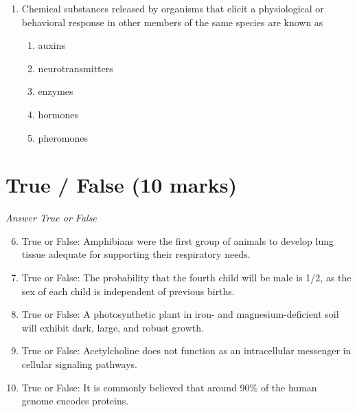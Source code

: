 \documentclass[12pt]{article}
\begin{document}
\begin{enumerate}[label=\arabic*.]
\begin{enumerate}[label=(\alph*)]
    \item RNAse H
    \item Helicase
    \item integrase
    \item DNA ligase
    \item protease
\end{enumerate}
\item Chemical substances released by organisms that elicit a physiological or behavioral response in other members of the same species are known as
\begin{enumerate}[label=(\alph*)]
    \item auxins
    \item neurotransmitters
    \item enzymes
    \item hormones
    \item pheromones
\end{enumerate}
\end{enumerate}

\section*{True / False (10 marks)}
\textit{Answer True or False}
\begin{enumerate}[label=\arabic*.]
\setcounter{enumi}{5}
\item True or False: Amphibians were the first group of animals to develop lung tissue adequate for supporting their respiratory needs.
\item True or False: The probability that the fourth child will be male is 1/2, as the sex of each child is independent of previous births.
\item True or False: A photosynthetic plant in iron- and magnesium-deficient soil will exhibit dark, large, and robust growth.
\item True or False: Acetylcholine does not function as an intracellular messenger in cellular signaling pathways.
\item True or False: It is commonly believed that around 90\% of the human genome encodes proteins.
\end{enumerate}
\end{document}
